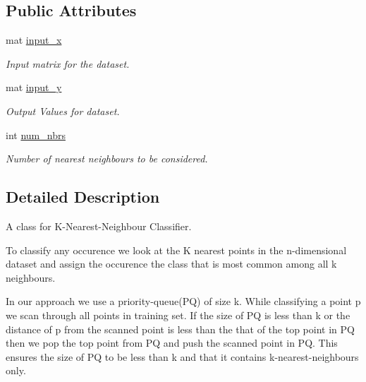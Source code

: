 \subsection*{Public Attributes}
\begin{DoxyCompactItemize}
\item 
\mbox{\label{classKNNClassifier_a493ac2acba58a77864219be5dc0e146c}} 
mat \hyperlink{classKNNClassifier_a493ac2acba58a77864219be5dc0e146c}{input\+\_\+x}
\begin{DoxyCompactList}\small\item\em Input matrix for the dataset. \end{DoxyCompactList}\item 
\mbox{\label{classKNNClassifier_ac2ec746aab804e6e37de3485291bf551}} 
mat \hyperlink{classKNNClassifier_ac2ec746aab804e6e37de3485291bf551}{input\+\_\+y}
\begin{DoxyCompactList}\small\item\em Output Values for dataset. \end{DoxyCompactList}\item 
\mbox{\label{classKNNClassifier_a0142bac6dbbb66916fa9aacfdb36341c}} 
int \hyperlink{classKNNClassifier_a0142bac6dbbb66916fa9aacfdb36341c}{num\+\_\+nbrs}
\begin{DoxyCompactList}\small\item\em Number of nearest neighbours to be considered. \end{DoxyCompactList}\end{DoxyCompactItemize}


\subsection{Detailed Description}
A class for K-\/\+Nearest-\/\+Neighbour Classifier. 

To classify any occurence we look at the K nearest points in the n-\/dimensional dataset and assign the occurence the class that is most common among all k neighbours.

In our approach we use a priority-\/queue(PQ) of size k. While classifying a point p we scan through all points in training set. If the size of PQ is less than k or the distance of p from the scanned point is less than the that of the top point in PQ then we pop the top point from PQ and push the scanned point in PQ. This ensures the size of PQ to be less than k and that it contains k-\/nearest-\/neighbours only. 

